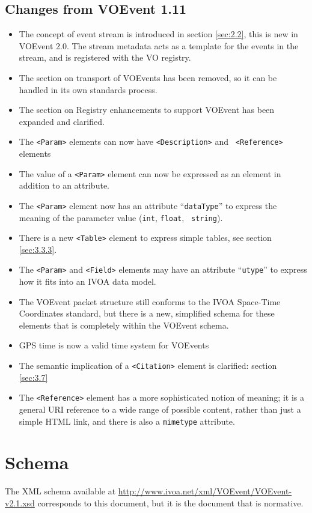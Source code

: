 \documentclass[11pt,a4paper]{ivoa}
\begin{document}
\subsection{Changes from VOEvent 1.11}
\begin{itemize}
\item The concept of event stream is introduced in section \ref{sec:2.2}, this 
is new in VOEvent 2.0. The stream metadata acts as a template for the events in 
the stream, and is registered with the VO registry. 
\item The section on transport of VOEvents has been removed, so it can be 
handled in its own standards process. 
\item The section on Registry enhancements to support VOEvent has been expanded 
and clarified. 
\item The {\tt <Param>} elements can now have {\tt <Description>} and {\tt 
<Reference>} elements 
\item The value of a {\tt <Param>} element can now be expressed as an element 
in addition to an attribute. 
\item The {\tt <Param>} element now has an attribute ``{\tt dataType}'' to 
express the meaning of the parameter value ({\tt int}, {\tt float}, {\tt 
string}). 
\item There is a new {\tt <Table>} element to express simple tables, see section
\ref{sec:3.3.3}. 
\item The {\tt <Param>} and {\tt <Field>} elements may have an attribute 
``{\tt utype}'' to express how it fits into an IVOA data model. 
\item The VOEvent packet structure still conforms to the IVOA Space-Time 
Coordinates standard, but there is a new, simplified schema for these elements 
that is completely within the VOEvent schema. 
\item GPS time is now a valid time system for VOEvents 
\item The semantic implication of a {\tt <Citation>} element is clarified: 
section \ref{sec:3.7} 
\item The {\tt <Reference>} element has a more sophisticated notion of meaning; 
it is a general URI reference to a wide range of possible content, rather than 
just a simple HTML link, and there is also a {\tt mimetype} attribute. 
\end{itemize}

\section{Schema}
\label{sec7}
The XML schema available at 
\url{http://www.ivoa.net/xml/VOEvent/VOEvent-v2.1.xsd} corresponds to this 
document, but it is the document that is normative. 
\end{document}
